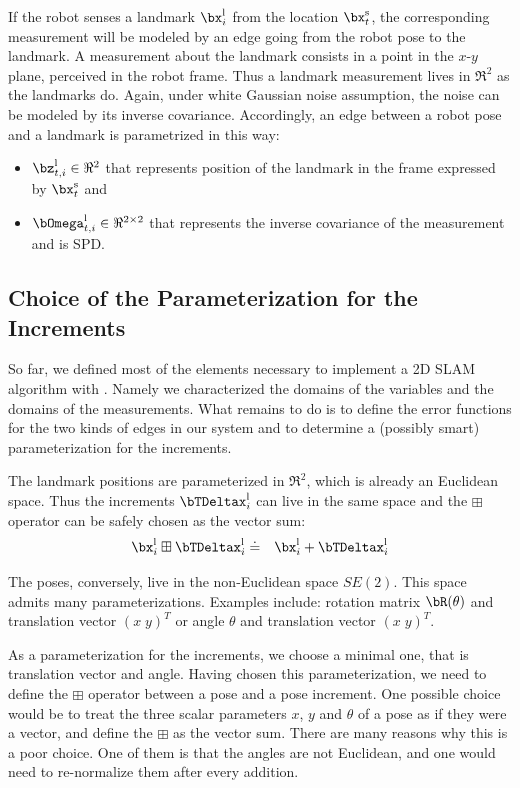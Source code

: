 \documentclass[a4paper]{article}
\begin{document}
If the robot senses a landmark $\bx^\mathrm{l}_i$ from the location
$\bx^\mathrm{s}_t$, the corresponding measurement will be modeled by
an edge going from the robot pose to the landmark. A measurement about
the landmark consists in a point in the $x$-$y$ plane, perceived in the
robot frame. Thus a landmark measurement lives in $\Re^2$ as the
landmarks do. Again, under white Gaussian noise assumption, the
noise can be modeled by its inverse covariance. Accordingly, an edge between
a robot pose and a landmark is parametrized in this way:
\begin{itemize}
\item $\bz^\mathrm{l}_{t,i} \in \Re^2$ that represents position of the landmark
  in the frame expressed by $\bx^\mathrm{s}_t$ and
\item $\bOmega^\mathrm{l}_{t,i} \in \Re^{2 \times 2}$ that represents the inverse
  covariance of the measurement and is SPD.
\end{itemize}

\subsection{Choice of the Parameterization for the Increments}
So far, we defined most of the elements necessary to implement a 2D
SLAM algorithm with \gopt{}.  Namely we characterized the domains of
the variables and the domains of the measurements.  What remains to do
is to define the error functions for the two kinds of edges in our
system and to determine a (possibly smart) parameterization for the
increments.


The landmark positions are parameterized in $\Re^2$, which is already
an Euclidean space. Thus the increments $\bTDeltax^\mathrm{l}_i$ can live in the same space and the
 $\boxplus$ operator can be safely chosen as the vector sum:
\begin{eqnarray}
  \bx^\mathrm{l}_i \boxplus \bTDeltax^\mathrm{l}_i   & \doteq & \bx^\mathrm{l}_i + \bTDeltax^\mathrm{l}_i
\end{eqnarray}

The poses, conversely, live in the non-Euclidean space $SE(2)$.
This space admits many parameterizations. Examples include:
rotation matrix $\bR(\theta)$ and translation vector $(x \; y)^T$ or
angle $\theta$ and translation vector $(x \; y)^T$.

As a parameterization for the increments, we choose a minimal one,
that is translation vector and angle. Having chosen this
parameterization, we need to define the $\boxplus$ operator between a
pose and a pose increment.  One possible choice would be to treat the
three scalar parameters $x$, $y$ and $\theta$ of a pose as if they
were a vector, and define the $\boxplus$ as the vector sum.  There are
many reasons why this is a poor choice. One of them is that the angles
are not Euclidean, and one would need to re-normalize them after every
addition.
\end{document}
